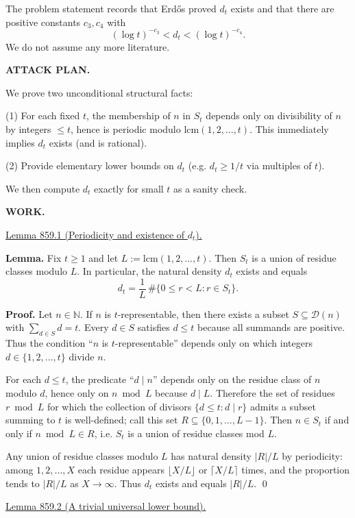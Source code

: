 The problem statement records that Erd\H{o}s proved $d_t$ exists and that there are positive constants $c_3,c_4$ with
\[
(\log t)^{-c_3} < d_t < (\log t)^{-c_4}.
\]
We do not assume any more literature.

\medskip
\noindent\textbf{ATTACK PLAN.}

We prove two unconditional structural facts:

(1) For each fixed $t$, the membership of $n$ in $S_t$ depends only on divisibility of $n$ by integers $\le t$, hence is periodic modulo $\mathrm{lcm}(1,2,\dots,t)$. This immediately implies $d_t$ exists (and is rational).

(2) Provide elementary lower bounds on $d_t$ (e.g. $d_t\ge 1/t$ via multiples of $t$).

We then compute $d_t$ exactly for small $t$ as a sanity check.

\medskip
\noindent\textbf{WORK.}

\medskip
\noindent\underline{Lemma 859.1 (Periodicity and existence of $d_t$).}

\textbf{Lemma.}
Fix $t\ge 1$ and let $L:=\mathrm{lcm}(1,2,\dots,t)$. Then $S_t$ is a union of residue classes modulo $L$. In particular, the natural density $d_t$ exists and equals
\[
 d_t = \frac{1}{L}\,\#\{0\le r<L : r\in S_t\}.
\]

\textbf{Proof.}
Let $n\in\mathbb N$.
If $n$ is $t$-representable, then there exists a subset $S\subseteq\mathcal D(n)$ with $\sum_{d\in S} d=t$. Every $d\in S$ satisfies $d\le t$ because all summands are positive.
Thus the condition ``$n$ is $t$-representable'' depends only on which integers $d\in\{1,2,\dots,t\}$ divide $n$.

For each $d\le t$, the predicate ``$d\mid n$'' depends only on the residue class of $n$ modulo $d$, hence only on $n\bmod L$ because $d\mid L$.
Therefore the set of residues $r\bmod L$ for which the collection of divisors $\{d\le t: d\mid r\}$ admits a subset summing to $t$ is well-defined; call this set $R\subseteq\{0,1,\dots,L-1\}$.
Then $n\in S_t$ if and only if $n\bmod L\in R$, i.e. $S_t$ is a union of residue classes mod $L$.

Any union of residue classes modulo $L$ has natural density $|R|/L$ by periodicity: among $1,2,\dots,X$ each residue appears $\lfloor X/L\rfloor$ or $\lceil X/L\rceil$ times, and the proportion tends to $|R|/L$ as $X\to\infty$.
Thus $d_t$ exists and equals $|R|/L$.
\qed

\medskip
\noindent\underline{Lemma 859.2 (A trivial universal lower bound).}

